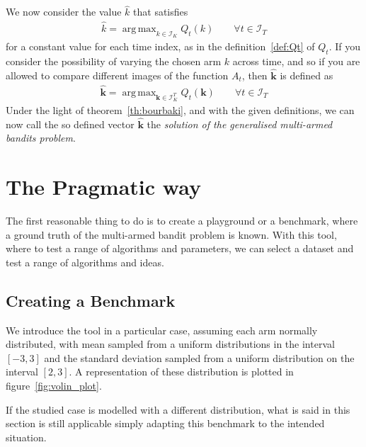 \documentclass[]{scrartcl}
\DeclareMathOperator*{\argmax}{arg\,max}
\theoremstyle{definition}
\begin{document}
We now consider the value $\hat{k}$ that satisfies
\begin{align*}
\hat{k} = \argmax_{k \in \mathcal{I}_K} Q_t(k)
\qquad
\forall t \in \mathcal{I}_T
\end{align*}
for a constant value for each time index, as in the definition~\ref{def:Qt} of $Q_t$.
If you consider the possibility of varying the chosen arm $k$ across time, and so if you are allowed to compare different images of the function $A_t$, then $\hat{\mathbf{k}}$ is defined as
\begin{align}\label{eq:bourbaki_solution}
\hat{\mathbf{k}}
=
\argmax_{\mathbf{k} \in \mathcal{I}_K^{T}} Q_t(\mathbf{k})
\qquad
\forall t \in \mathcal{I}_T
\end{align}
Under the light of theorem~\ref{th:bourbaki}, and with the given definitions, we can now call the so defined vector $\hat{\mathbf{k}}$ the \emph{solution of the generalised multi-armed bandits problem}.

\section{The Pragmatic way}
\label{se:pragmatic_perspective}

The first reasonable thing to do is to create a playground or a benchmark, where a ground truth of the multi-armed bandit problem is known. With this tool, where to test a range of algorithms and parameters, we can select a dataset and test a range of algorithms and ideas.

\subsection*{Creating a Benchmark}

We introduce the tool in a particular case, assuming each arm normally distributed, with mean sampled from a uniform distributions in the interval $[-3, 3]$ and the standard deviation sampled from a uniform distribution on the interval $[2, 3]$. A representation of these distribution is plotted in
figure~\ref{fig:volin_plot}.

If the studied case is modelled with a different distribution, what is said in this section is still applicable simply adapting this benchmark to the intended situation.
\end{document}
